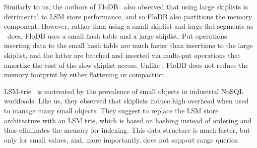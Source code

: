 Similarly to us, the authors of FloDB~\cite{flodb} also observed that using large skiplists is detrimental to 
LSM store performance, and so FloDB also partitions the memory component. However, rather than using 
a small skiplist and large flat segments as \sys\ does, FloDB  uses a small hash table and a large skiplist.
Put operations inserting data to the small hash table are much faster than insertions to the large skiplist, 
and the latter are batched and inserted via multi-put operations that amortize the cost of the slow skiplist access.
Unlike \sys, FloDB does not reduce the memory footprint by either flattening or compaction. 

LSM-trie~\cite{Wu2015} is motivated by the prevalence of small objects in industrial NoSQL workloads.  
Like us, they observed that skiplists induce high overhead when used to manage many small objects.  
They suggest to replace the LSM store architecture with an LSM trie, which is based on hashing instead of ordering 
and thus eliminates the memory for indexing. This data structure is much faster, but only for small values, and, more importantly, does not
support range queries.


